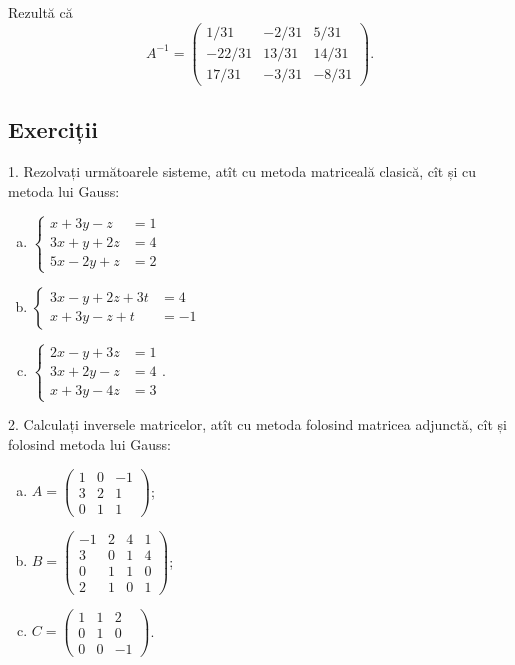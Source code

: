 Rezultă că 
\[
    A^{-1} = %
    \begin{pmatrix} 
        1/31 & -2/31 & 5/31 \\
      -22/31 & 13/31 & 14/31 \\
      17/31 & -3/31 & -8/31
  \end{pmatrix}.
\]


\subsection{Exerciții}

1. Rezolvați următoarele sisteme, atît cu metoda matriceală clasică, cît și cu
metoda lui Gauss:
\begin{enumerate}[(a)]
    \item $ \begin{cases}
            x + 3y - z &= 1 \\
            3x + y + 2z &= 4 \\
            5x - 2y + z &= 2
        \end{cases} $
    \item $ \begin{cases}
            3x - y + 2z + 3t &= 4 \\
            x + 3y - z + t &= -1
        \end{cases} $
    \item $ \begin{cases}
            2x - y + 3z &= 1 \\
            3x + 2y - z &= 4 \\
            x + 3y - 4z &= 3
        \end{cases} $.
\end{enumerate}

\vspace{1cm}

2. Calculați inversele matricelor, atît cu metoda folosind matricea adjunctă,
cît și folosind metoda lui Gauss:
\begin{enumerate}[(a)]
    \item $ A =
        \begin{pmatrix}
            1 & 0 & -1 \\
            3 & 2 & 1 \\
            0 & 1 & 1
        \end{pmatrix} $;
    \item $ B =
        \begin{pmatrix}
            -1 & 2 & 4 & 1 \\
            3 & 0 & 1 & 4 \\
            0 & 1 & 1 & 0 \\
            2 & 1 & 0 & 1
        \end{pmatrix} $;
    \item $ C =
        \begin{pmatrix}
            1 & 1 & 2 \\
            0 & 1 & 0 \\
            0 & 0 & -1
        \end{pmatrix} $.
\end{enumerate}


